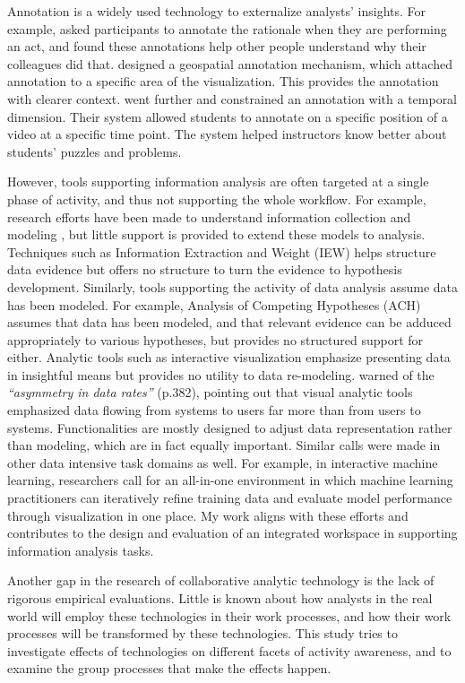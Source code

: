 Annotation is a widely used technology to externalize analysts’ insights. For example, \cite{Xiao2008c} asked participants to annotate the rationale when they are performing an act, and found these annotations help other people understand why their colleagues did that. \cite{Hopfer2007b} designed a geospatial annotation mechanism, which attached annotation to a specific area of the visualization. This provides the annotation with clearer context. \cite{Dorn2015a} went further and constrained an annotation with a temporal dimension. Their system allowed students to annotate on a specific position of a video at a specific time point. The system helped instructors know better about students’ puzzles and problems. 

However, tools supporting information analysis are often targeted at a single phase of activity, and thus not supporting the whole workflow. For example, research efforts have been made to understand information collection and modeling \citep{Shah2014i, Jansen2010c}, but little support is provided to extend these models to analysis. Techniques such as Information Extraction and Weight (IEW) helps structure data evidence but offers no structure to turn the evidence to hypothesis development. Similarly, tools supporting the activity of data analysis assume data has been modeled. For example,  Analysis of Competing Hypotheses (ACH) assumes that data has
been modeled, and that relevant evidence can be adduced appropriately to various
hypotheses, but provides no structured support for either. Analytic tools such as interactive visualization emphasize presenting data in insightful means but provides no utility to data re-modeling.
\cite{Ware2012} warned of the \emph{``asymmetry in data rates''} (p.382),
pointing out that visual analytic tools emphasized data flowing from systems to
users far more than from users to systems. Functionalities are mostly designed
to adjust data representation rather than modeling, which are in fact equally
important. Similar calls were made in other data intensive task domains as well. For
example, in interactive machine learning, researchers \citep{Chen2016,Amershi2015} call for an all-in-one environment in which machine learning
practitioners can iteratively refine training data and evaluate model performance through
visualization in one place. My work aligns with these efforts and contributes to the design and
evaluation of an integrated workspace in supporting information analysis tasks.

Another gap in the research of collaborative analytic technology is the lack of rigorous empirical evaluations. Little is known about how analysts in the real world will employ these technologies in their work processes, and how their work processes will be transformed by these technologies. This study tries to investigate effects of technologies on different facets of activity awareness, and to examine the group processes that make the effects happen.